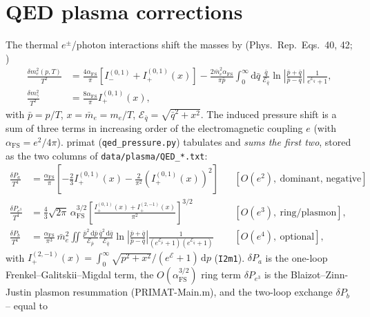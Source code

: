 \documentclass[11pt,a4paper]{article}
\newcommand{\dd}{\mathrm{d}}
\newcommand{\code}[1]{\texttt{#1}}
\newcommand{\PR}{Phys.\ Rep.}
\newcommand{\afs}{\alpha_{\mathrm{FS}}}
\begin{document}
\section{QED plasma corrections}\label{app:qed}
The thermal $e^\pm$/photon interactions shift the masses by (\PR\ Eqs.~40, 42;
\cite{Mangano2001,LopezTurner1998})
\begin{equation}
\begin{aligned}
  \frac{\delta m_e^2(p,T)}{T^2} &= \frac{4\afs}{\pi}\left[I^{(0,1)}_- + I^{(0,1)}_+(x)\right]
     - \frac{2\bar m_e^2\afs}{\pi\bar p}\!\int_0^\infty\!\dd\bar q\,
       \frac{\bar q}{\mathcal{E}_{\bar q}}
       \ln\!\left|\frac{\bar p+\bar q}{\bar p-\bar q}\right|\,
       \frac{1}{e^{\mathcal{E}_{\bar q}}+1},\\
  \frac{\delta m_\gamma^2}{T^2} &= \frac{8\afs}{\pi}I^{(0,1)}_+(x),
\end{aligned}
\end{equation}
with $\bar p=p/T$, $x=\bar m_e=m_e/T$, $\mathcal{E}_{\bar q}=\sqrt{\bar q^2+x^2}$.
The induced pressure shift is a sum of three terms in increasing order of the
electromagnetic coupling $e$ (with $\afs=e^2/4\pi$). primat
(\code{qed\_pressure.py}) tabulates and \emph{sums the first two}, stored as the
two columns of \code{data/plasma/QED\_*.txt}:
\begin{align}
  \frac{\delta P_a}{T^4} &= \frac{\afs}{\pi}\!\left[
     -\frac{2}{3}I^{(0,1)}_+(x) - \frac{2}{\pi^2}\left(I^{(0,1)}_+(x)\right)^2\right]
     && [O(e^2),\ \text{dominant, negative}],\\
  \frac{\delta P_{e^3}}{T^4} &= \frac{4}{3}\sqrt{2\pi}\,\afs^{3/2}
     \left[\frac{I^{(0,1)}_+(x)+I^{(2,-1)}_+(x)}{\pi^2}\right]^{3/2}
     && [O(e^3),\ \text{ring/plasmon}],\\
  \frac{\delta P_b}{T^4} &= \frac{\afs}{\pi^3}\,\bar m_e^2\!
     \iint\!\frac{\bar p^2\,\dd\bar p}{\mathcal{E}_{\bar p}}
     \frac{\bar q^2\,\dd\bar q}{\mathcal{E}_{\bar q}}
     \ln\!\left|\frac{\bar p+\bar q}{\bar p-\bar q}\right|
     \frac{1}{(e^{\mathcal{E}_{\bar p}}+1)(e^{\mathcal{E}_{\bar q}}+1)}
     && [O(e^4),\ \text{optional}],
\end{align}
with $I^{(2,-1)}_+(x)=\int_0^\infty\!\sqrt{p^2+x^2}/(e^{\mathcal{E}}+1)\,\dd p$
(\code{I2m1}). $\delta P_a$ is the one-loop Frenkel--Galitskii--Migdal term, the
$O(\afs^{3/2})$ ring term $\delta P_{e^3}$ is the Blaizot--Zinn-Justin plasmon
resummation (PRIMAT-Main.m), and the two-loop exchange $\delta P_b$ -- equal to
\end{document}
